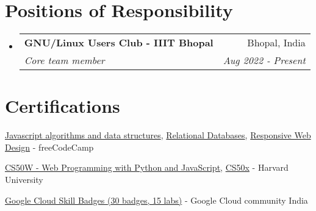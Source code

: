 \documentclass[a4paper,20pt]{article}
\makeatletter
\newcommand{\resumeSubheading}[4]{
  \vspace{-1pt}\item
    \begin{tabular*}{0.97\textwidth}{l@{\extracolsep{\fill}}r}
      \textbf{#1} & #2 \\
      \textit{#3} & \textit{#4} \\
    \end{tabular*}\vspace{-5pt}
}
\newcommand{\resumeCertification}[3]{
  \item \small{
    \textbf{#1}{ - #2 \hfill #3 \vspace{-5pt}}
  }
}
\newcommand{\resumeSubHeadingListStart}{\begin{itemize}[label={}, leftmargin=*]}
\newcommand{\resumeSubHeadingListEnd}{\end{itemize}}
\makeatother
\begin{document}
\vspace{-2pt}
\section{Positions of Responsibility}
\resumeSubHeadingListStart
    \resumeSubheading
    {GNU/Linux Users Club - IIIT Bhopal}{Bhopal, India}
    {Core team member}{Aug 2022 - Present}

\resumeSubHeadingListEnd

\vspace{-5pt}

\section{Certifications}
\begin{description}[font=$ $]
    \item {\href{https://www.freecodecamp.org/certification/satyamrs00/javascript-algorithms-and-data-structures}{Javascript algorithms and data structures}, \href{https://www.freecodecamp.org/certification/satyamrs00/relational-database-v8}{Relational Databases}, \href{https://www.freecodecamp.org/certification/satyamrs00/responsive-web-design}{Responsive Web Design} - freeCodeCamp} 
    \vspace{-5pt}
    \item {\href{https://cs50.harvard.edu/certificates/0012af60-69d4-4f28-8829-5c4eac4cae39}{CS50W - Web Programming with Python and JavaScript}, \href{https://certificates.cs50.io/5a9d3a4b-57f0-4d46-95fa-222159e1368f.pdf?size=letter}{CS50x} - Harvard University}
    \vspace{-5pt}
    \item {\href{https://www.cloudskillsboost.google/public_profiles/979efb3e-91bc-476f-ba38-d35c4879a1fa}{Google Cloud Skill Badges (30 badges, 15 labs)} - Google Cloud community India}
    \vspace{-5pt}
\end{description}
\end{document}
